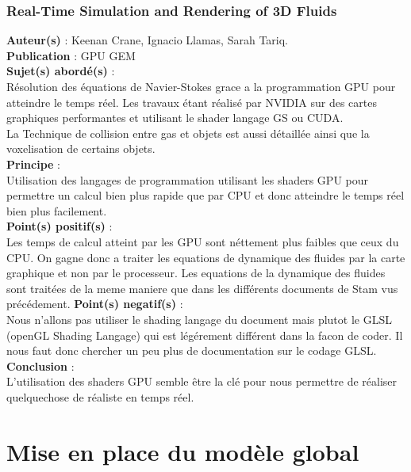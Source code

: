 \documentclass[a4paper,10pt]{article}
\begin{document}
\subsubsection{Real-Time Simulation and Rendering of 3D Fluids}
\textbf{Auteur(s)} : Keenan Crane, Ignacio Llamas, Sarah Tariq.\\
\textbf{Publication} : GPU GEM \\
\textbf{Sujet(s) abordé(s)} : \\ 
	Résolution des équations de Navier-Stokes grace a la programmation GPU pour atteindre le temps réel. Les travaux étant réalisé par NVIDIA sur des cartes graphiques performantes et utilisant le shader langage GS ou CUDA.\\
	La Technique de collision entre gas et objets est aussi détaillée ainsi que la voxelisation de certains objets.\\
\textbf{Principe} :\\	
	Utilisation des langages de programmation utilisant les shaders GPU pour permettre un calcul bien plus rapide que par CPU et donc atteindre le temps réel bien plus facilement.\\
\textbf{Point(s) positif(s)} :\\
	Les temps de calcul atteint par les GPU sont néttement plus faibles que ceux du CPU. On gagne donc a traiter les equations de dynamique des fluides par la carte graphique et non par le processeur. Les equations de la dynamique des fluides sont traitées de la meme maniere que dans les différents documents de Stam vus précédement.
\textbf{Point(s) negatif(s)} :\\
	Nous n'allons pas utiliser le shading langage du document mais plutot le GLSL (openGL Shading Langage) qui est légérement différent dans la facon de coder. Il nous faut donc chercher un peu plus de documentation sur le codage GLSL.\\
\textbf{Conclusion} :\\
	L'utilisation des shaders GPU semble être la clé pour nous permettre de réaliser quelquechose de réaliste en temps réel.\\


\section{Mise en place du modèle global}
\end{document}
